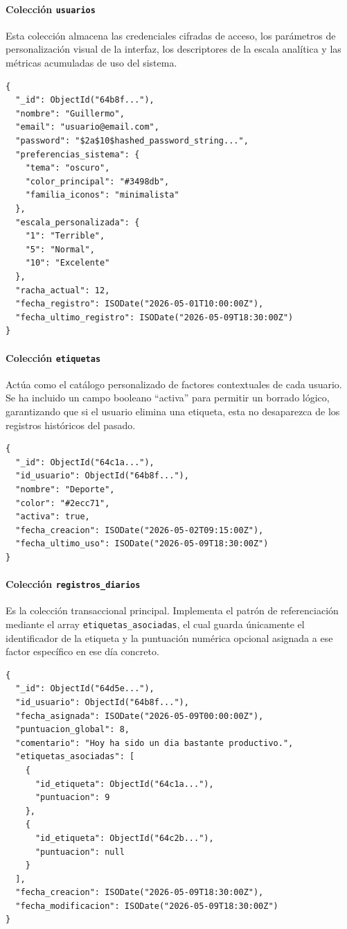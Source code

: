 \paragraph{Colección \texttt{usuarios}}
Esta colección almacena las credenciales cifradas de acceso, los parámetros de personalización visual de la interfaz, los descriptores de la escala analítica y las métricas acumuladas de uso del sistema.

\begin{lstlisting}[style=estiloJSON]
{
  "_id": ObjectId("64b8f..."),
  "nombre": "Guillermo",
  "email": "usuario@email.com",
  "password": "$2a$10$hashed_password_string...",
  "preferencias_sistema": {
    "tema": "oscuro",
    "color_principal": "#3498db",
    "familia_iconos": "minimalista"
  },
  "escala_personalizada": {
    "1": "Terrible",
    "5": "Normal",
    "10": "Excelente"
  },
  "racha_actual": 12,
  "fecha_registro": ISODate("2026-05-01T10:00:00Z"),
  "fecha_ultimo_registro": ISODate("2026-05-09T18:30:00Z")
}
\end{lstlisting}

\paragraph{Colección \texttt{etiquetas}}
Actúa como el catálogo personalizado de factores contextuales de cada usuario. Se ha incluido un campo booleano ``activa'' para permitir un borrado lógico, garantizando que si el usuario elimina una etiqueta, esta no desaparezca de los registros históricos del pasado.

\begin{lstlisting}[style=estiloJSON]
{
  "_id": ObjectId("64c1a..."),
  "id_usuario": ObjectId("64b8f..."),
  "nombre": "Deporte",
  "color": "#2ecc71",
  "activa": true,
  "fecha_creacion": ISODate("2026-05-02T09:15:00Z"),
  "fecha_ultimo_uso": ISODate("2026-05-09T18:30:00Z")
}
\end{lstlisting}

\paragraph{Colección \texttt{registros\_diarios}}
Es la colección transaccional principal. Implementa el patrón de referenciación mediante el array \texttt{etiquetas\_asociadas}, el cual guarda únicamente el identificador de la etiqueta y la puntuación numérica opcional asignada a ese factor específico en ese día concreto.

\begin{lstlisting}[style=estiloJSON]
{
  "_id": ObjectId("64d5e..."),
  "id_usuario": ObjectId("64b8f..."),
  "fecha_asignada": ISODate("2026-05-09T00:00:00Z"),
  "puntuacion_global": 8,
  "comentario": "Hoy ha sido un dia bastante productivo.",
  "etiquetas_asociadas": [
    {
      "id_etiqueta": ObjectId("64c1a..."),
      "puntuacion": 9
    },
    {
      "id_etiqueta": ObjectId("64c2b..."),
      "puntuacion": null
    }
  ],
  "fecha_creacion": ISODate("2026-05-09T18:30:00Z"),
  "fecha_modificacion": ISODate("2026-05-09T18:30:00Z")
}
\end{lstlisting}

